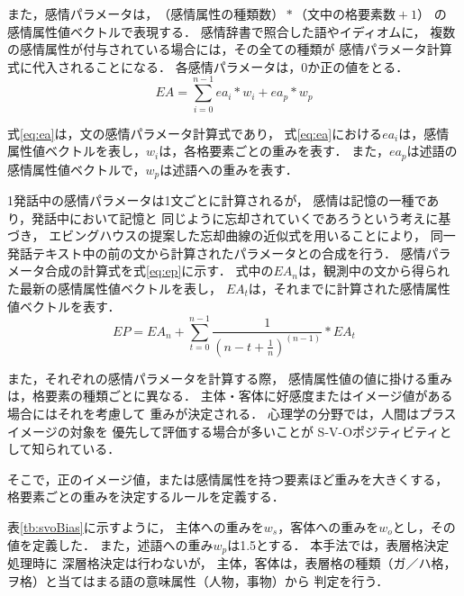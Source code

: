 \documentclass[japanese]{jnlp_1.3c}
\begin{document}
また，感情パラメータは，$（感情属性の種類数）*（文中の格要素数+1）$ の
感情属性値ベクトルで表現する．
感情辞書で照合した語やイディオムに，
複数の感情属性が付与されている場合には，その全ての種類が
感情パラメータ計算式に代入されることになる．
各感情パラメータは，0か正の値をとる．
\begin{equation}\label{eq:ea}
EA = \sum^{n-1}_{i=0} ea_{i} * w_i  + ea_p * w_p
\end{equation}

式\ref{eq:ea}は，文の感情パラメータ計算式であり，
式\ref{eq:ea}における$ea_{i}$は，感情属性値ベクトルを表し，$w_i$は，各格要素ごとの重みを表す．
また，$ea_p$は述語の感情属性値ベクトルで，$w_p$は述語への重みを表す．

1発話中の感情パラメータは1文ごとに計算されるが，
感情は記憶の一種であり，発話中において記憶と
同じように忘却されていくであろうという考えに基づき，
エビングハウスの提案した忘却曲線\cite{eb}の近似式を用いることにより，
同一発話テキスト中の前の文から計算されたパラメータとの合成を行う．
感情パラメータ合成の計算式を式\ref{eq:ep}に示す．
式中の$EA_n$は，観測中の文から得られた最新の感情属性値ベクトルを表し，
$EA_t$は，それまでに計算された感情属性値ベクトルを表す．
\begin{equation}\label{eq:ep}
EP = EA_n + \sum^{n-1}_{t=0} \frac{1}{(n-t+\frac{1}{n})^{(n-1)}}*EA_t  
\end{equation} 

また，それぞれの感情パラメータを計算する際，
感情属性値の値に掛ける重みは，格要素の種類ごとに異なる．
主体・客体に好感度またはイメージ値がある場合にはそれを考慮して
重みが決定される．
心理学の分野では，人間はプラスイメージの対象を
優先して評価する場合が多いことが S-V-Oポジティビティ\cite{Inomata}として知られている．

そこで，正のイメージ値，または感情属性を持つ要素ほど重みを大きくする，
格要素ごとの重みを決定するルールを定義する．

表\ref{tb:svoBias}に示すように，
主体への重みを$w_s$，客体への重みを$w_o$とし，その値を定義した．
また，述語への重み$w_p$は1.5とする．
本手法では，表層格決定処理時に
深層格決定は行わないが，
主体，客体は，表層格の種類（ガ／ハ格，ヲ格）と当てはまる語の意味属性（人物，事物）から
判定を行う．
\end{document}
